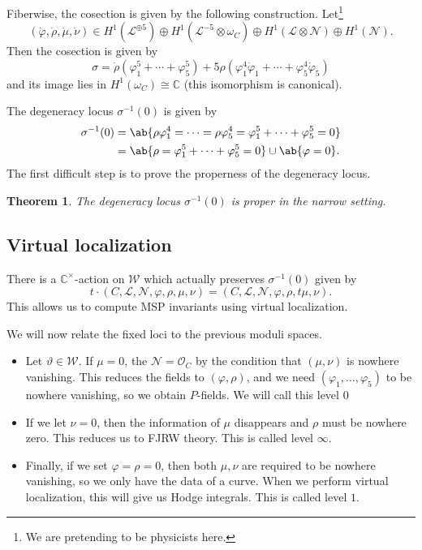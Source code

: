 \documentclass[10pt,oldfontcommands,oneside]{memoir}
\newtheorem{thm}{Theorem}[section]
\theoremstyle{definition}
\theoremstyle{remark}
\theoremstyle{plain}
\theoremstyle{definition}
\theoremstyle{remark}
\newcommand{\C}{\mathbb{C}}
\newcommand{\mc}[1]{\mathcal{#1}}
\newcommand{\1}{\mathbf{1}}
\newcommand{\2}{\mathbf{2}}
\newcommand{\3}{\mathbf{3}}
\begin{document}
Fiberwise, the cosection is given by the following construction. Let\footnote{We are pretending to be physicists here.}
\[ (\dot{\varphi}, \dot{\rho}, \dot{\mu}, \dot{\nu}) \in H^1(\mc{L}^{\oplus 5}) \oplus H^1(\mc{L}^{-5} \otimes \omega_C) \oplus H^1(\mc{L} \otimes \mc{N}) \oplus H^1(\mc{N}). \]
Then the cosection is given by
\[ \sigma = \dot{\rho}(\varphi_1^5 + \cdots + \varphi_5^5) + 5 \rho (\varphi_1^4 \dot{\varphi}_1 + \cdots + \varphi_5^4 \dot{\varphi}_5) \]
and its image lies in $H^1(\omega_C) \cong \C$ (this isomorphism is canonical).

The degeneracy locus $\sigma^{-1}(0)$ is given by
\begin{align*}
    \sigma^{-1}(0) &= \ab\{ \rho \varphi_1^4 = \cdots = \rho \varphi_5^4 = \varphi_1^5 + \cdots + \varphi_5^5 = 0\} \\
    &= \ab\{ \rho = \varphi_1^5 + \cdots + \varphi_5^5 = 0\} \cup \ab\{ \varphi = 0 \}.
\end{align*}
The first difficult step is to prove the properness of the degeneracy locus.

\begin{thm}
    The degeneracy locus $\sigma^{-1}(0)$ is proper in the narrow setting.
\end{thm}

\subsection{Virtual localization}%
\label{sub:Torus action}

There is a $\C^{\times}$-action on $\mc{W}$ which actually preserves $\sigma^{-1}(0)$ given by
\[ t \cdot (C, \mc{L},\mc{N},\varphi,\rho,\mu,\nu) = (C, \mc{L},\mc{N},\varphi, \rho,t\mu,\nu). \]
This allows us to compute MSP invariants using virtual localization.

We will now relate the fixed loci to the previous moduli spaces.

\begin{itemize}
    \item Let $\vartheta \in \mc{W}$. If $\mu = 0$, the $\mc{N} = \mc{O}_C$ by the condition that $(\mu,\nu)$ is nowhere vanishing. This reduces the fields to $(\varphi, \rho)$, and we need $(\varphi_1, \ldots, \varphi_5)$ to be nowhere vanishing, so we obtain $P$-fields. We will call this level $0$
    \item If we let $\nu = 0$, then the information of $\mu$ disappears and $\rho$ must be nowhere zero. This reduces us to FJRW theory. This is called level $\infty$.
    \item Finally, if we set $\varphi = \rho = 0$, then both $\mu, \nu$ are required to be nowhere vanishing, so we only have the data of a curve. When we perform virtual localization, this will give us Hodge integrals. This is called level $1$.
\end{itemize}
\end{document}
